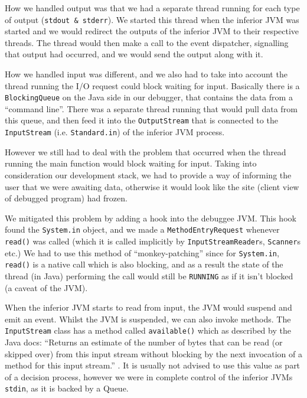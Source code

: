 \documentclass[11pt, a4paper]{article}
\begin{document}
How we handled output was that we had a separate thread running for each type of output (\texttt{stdout \& stderr}). We started this thread when the inferior JVM was started and we would redirect the outputs of the inferior JVM to their respective threads.
The thread would then make a call to the event dispatcher, signalling that output had occurred, and we would send the output along with it.

How we handled input was different, and we also had to take into account the thread running the I/O request could block waiting for input.
Basically there is a \texttt{BlockingQueue} on the Java side in our debugger, that contains the data from a ``command line''.
There was a separate thread running that would pull data from this queue, and then feed it into the \texttt{OutputStream} that is connected to the \texttt{InputStream} (i.e. \texttt{Standard.in}) of the inferior JVM process.

However we still had to deal with the problem that occurred when the thread running the main function would block waiting for input.
Taking into consideration our development stack, we had to provide a way of informing the user that we were awaiting data, otherwise it would look like the site (client view of debugged program) had frozen.

We mitigated this problem by adding a hook into the debuggee JVM.
This hook found the \texttt{System.in} object, and we made a \texttt{MethodEntryRequest} whenever \texttt{read()} was called (which it is called implicitly by \texttt{InputStreamReader}s, \texttt{Scanner}s etc.)
We had to use this method of ``monkey-patching'' since for \texttt{System.in}, \texttt{read()} is a native call which is also blocking, and as a result the state of the thread (in Java) performing the call would still be \texttt{RUNNING} as if it isn't blocked (a caveat of the JVM).

When the inferior JVM starts to read from input, the JVM would suspend and emit an event.
Whilst the JVM is suspended, we can also invoke methods.
The \texttt{InputStream} class has a method called \texttt{available()} which as described by the Java docs: ``Returns an estimate of the number of bytes that can be read (or skipped over) from this input stream without blocking by the next invocation of a method for this input stream.'' \cite{java_available}.
It is usually not advised to use this value as part of a decision process, however we were in complete control of the inferior JVMs \texttt{stdin}, as it is backed by a Queue.
\end{document}

